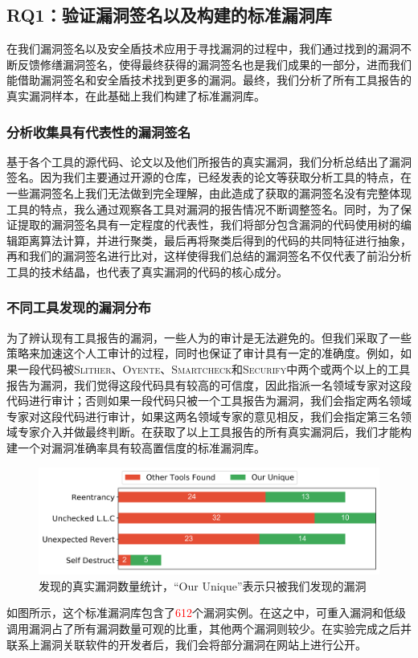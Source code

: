 \subsection{RQ1：验证漏洞签名以及构建的标准漏洞库}

在我们漏洞签名以及安全盾技术应用于寻找漏洞的过程中，我们通过找到的漏洞不断反馈修缮漏洞签名，使得最终获得的漏洞签名也是我们成果的一部分，进而我们能借助漏洞签名和安全盾技术找到更多的漏洞。最终，我们分析了所有工具报告的真实漏洞样本，在此基础上我们构建了标准漏洞库。

\subsubsection{分析收集具有代表性的漏洞签名}

基于各个工具的源代码、论文以及他们所报告的真实漏洞，我们分析总结出了漏洞签名。因为我们主要通过开源的仓库，已经发表的论文等获取分析工具的特点，在一些漏洞签名上我们无法做到完全理解，由此造成了获取的漏洞签名没有完整体现工具的特点，我么通过观察各工具对漏洞的报告情况不断调整签名。同时，为了保证提取的漏洞签名具有一定程度的代表性，我们将部分包含漏洞的代码使用树的编辑距离算法\cite{treeEditDistance}计算，并进行聚类，最后再将聚类后得到的代码的共同特征进行抽象，再和我们的漏洞签名进行比对，这样使得我们总结的漏洞签名不仅代表了前沿分析工具的技术结晶，也代表了真实漏洞的代码的核心成分。

\subsubsection{不同工具发现的漏洞分布}

为了辨认现有工具报告的漏洞，一些人为的审计是无法避免的。但我们采取了一些策略来加速这个人工审计的过程，同时也保证了审计具有一定的准确度。例如，如果一段代码被\textsc{Slither}、\textsc{Oyente}、\textsc{Smartcheck}和\textsc{Securify}中两个或两个以上的工具报告为漏洞，我们觉得这段代码具有较高的可信度，因此指派一名领域专家对这段代码进行审计；否则如果一段代码只被一个工具报告为漏洞，我们会指定两名领域专家对这段代码进行审计，如果这两名领域专家的意见相反，我们会指定第三名领域专家介入并做最终判断。在获取了以上工具报告的所有真实漏洞后，我们才能构建一个对漏洞准确率具有较高置信度的标准漏洞库。
\begin{figure}
  \centering
  \includegraphics[width=\linewidth]{figures/unique_tp.png}
  \caption{发现的真实漏洞数量统计，“Our Unique”表示只被我们发现的漏洞}\label{fig:unique_tp}
\end{figure}
如图所示，这个标准漏洞库包含了\textcolor{red}{612}个漏洞实例。在这之中，可重入漏洞和低级调用漏洞占了所有漏洞数量可观的比重，其他两个漏洞则较少。在实验完成之后并联系上漏洞关联软件的开发者后，我们会将部分漏洞在网站上进行公开。


